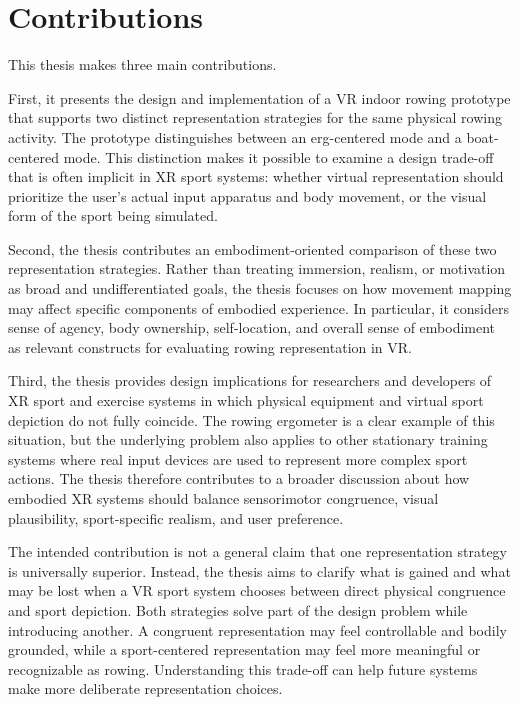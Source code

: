 \section{Contributions}
\label{sec:introduction_contributions}

This thesis makes three main contributions.

First, it presents the design and implementation of a VR indoor rowing prototype that supports two distinct representation strategies for the same physical rowing activity. The prototype distinguishes between an erg-centered mode and a boat-centered mode. This distinction makes it possible to examine a design trade-off that is often implicit in XR sport systems: whether virtual representation should prioritize the user's actual input apparatus and body movement, or the visual form of the sport being simulated.

Second, the thesis contributes an embodiment-oriented comparison of these two representation strategies. Rather than treating immersion, realism, or motivation as broad and undifferentiated goals, the thesis focuses on how movement mapping may affect specific components of embodied experience. In particular, it considers sense of agency, body ownership, self-location, and overall sense of embodiment as relevant constructs for evaluating rowing representation in VR.

Third, the thesis provides design implications for researchers and developers of XR sport and exercise systems in which physical equipment and virtual sport depiction do not fully coincide. The rowing ergometer is a clear example of this situation, but the underlying problem also applies to other stationary training systems where real input devices are used to represent more complex sport actions. The thesis therefore contributes to a broader discussion about how embodied XR systems should balance sensorimotor congruence, visual plausibility, sport-specific realism, and user preference.

The intended contribution is not a general claim that one representation strategy is universally superior. Instead, the thesis aims to clarify what is gained and what may be lost when a VR sport system chooses between direct physical congruence and sport depiction. Both strategies solve part of the design problem while introducing another. A congruent representation may feel controllable and bodily grounded, while a sport-centered representation may feel more meaningful or recognizable as rowing. Understanding this trade-off can help future systems make more deliberate representation choices.

